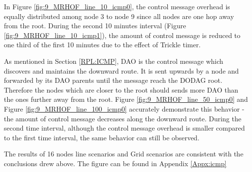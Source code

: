 In Figure \ref{fig:9_MRHOF_line_10_icmp0}, the control message overhead is equally distributed among node 3 to node 9 since all nodes are one hop away from the root. During the second 10 minutes interval (Figure \ref{fig:9_MRHOF_line_10_icmp1}), the amount of control message is reduced to one third of the first 10 minutes due to the effect of Trickle timer.
\newline

As mentioned in Section \ref{RPL:ICMP}, DAO is the control message which discovers and maintains the downward  route. It is sent upwards by a node and forwarded by its DAO parents until the message reach the DODAG root. Therefore the nodes which are closer to the root should sends more DAO than the ones further away from the root. Figure \ref{fig:9_MRHOF_line_50_icmp0} and Figure \ref{fig:9_MRHOF_line_100_icmp0} accurately demonstrate this behavior - the amount of control message decreases along the downward route. During the second time interval, although the control message overhead is smaller compared to the first time interval, the same behavior can still be observed. 
\newline 

The results of 16 nodes line scenarios and Grid scenarios are consistent with the conclusions drew above. The figure can be found in Appendix \ref{Appx:icmp}
  
